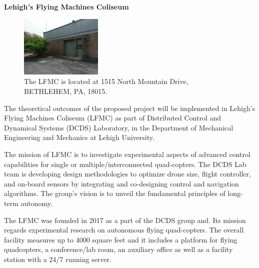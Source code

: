 \documentclass[english,letter,12pt,onesided]{article}
\theoremstyle{definition}
\begin{document}
\singlespacing
\begin{center}
\Large \textbf{Lehigh's Flying Machines Coliseum}
\end{center}
 \normalsize
\begin{figure}
\center
    \includegraphics[width=0.35\textwidth]{IMAG1065} 
    \caption*{The LFMC is located at 1515 North Mountain Drive, BETHLEHEM, PA, 18015.}
\end{figure}

\noindent The theoretical outcomes of the proposed project will be implemented in Lehigh's Flying Machines Coliseum (LFMC) as part of Distributed Control and Dynamical Systems (DCDS) Laboratory, in the Department of Mechanical Engineering and Mechanics at Lehigh University. 

The mission of LFMC is to investigate experimental aspects of  advanced control capabilities for single or multiple/interconnected quad-copters. The DCDS Lab team is developing design methodologies to optimize drone size, flight controller, and on-board sensors by integrating and co-designing control and navigation algorithms. The group's vision is to unveil the fundamental principles of long-term autonomy.

\vspace{0.1in}
\noindent The LFMC was founded in 2017 as a part of the DCDS group and. Its mission regards experimental research on autonomous flying quad-copters. The overall facility measures up to 4000 square feet and it includes a platform for flying quadcopters, a conference/lab room, an auxiliary office as well as a facility station with a 24/7 running server.
\end{document}
